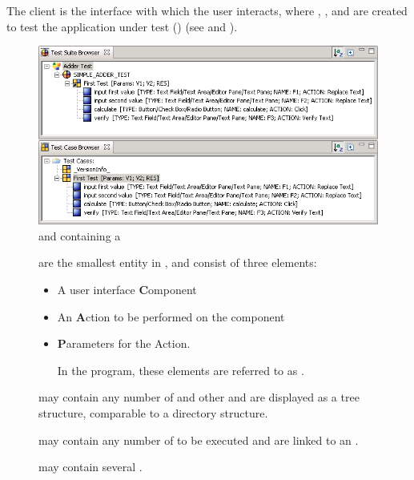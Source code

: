 
The client is the interface with which the user interacts, where 
\gdsteps{}, \gdcases{}, \gdsuites and \gdprojects are created to test the 
application under test (\gdaut{}) 
(see  and ). 

\begin{figure}[h]
\begin{center}
\includegraphics{GettingStarted/Structure/PS/testcasesandsteps}
\caption{\gdtestsuitebrowser and \gdtestcasebrowser containing a \gdcase}
\label{testcasesandsteps}
\end{center}
\end{figure}
\begin{description}
\item[\gdsteps]{ are the smallest 
entity in \jb{}{},  and consist of three elements:
\begin{itemize}
\item A user interface \textbf{C}omponent
\item An \textbf{A}ction to be performed on the component
\item \textbf{P}arameters for the Action.

In the program, these elements are referred to as .
\end{itemize}}


\item[\gdcases]{ may contain
 any number of  \gdsteps and other \gdcases and are
displayed as a tree structure, comparable to a directory structure.}

\item[\gdsuites]{ may contain any
 number of \gdcases to be executed and are linked to an \gdaut{}. }

\item[\gdprojects]{may contain several \gdsuites{}.}
\end{description}

